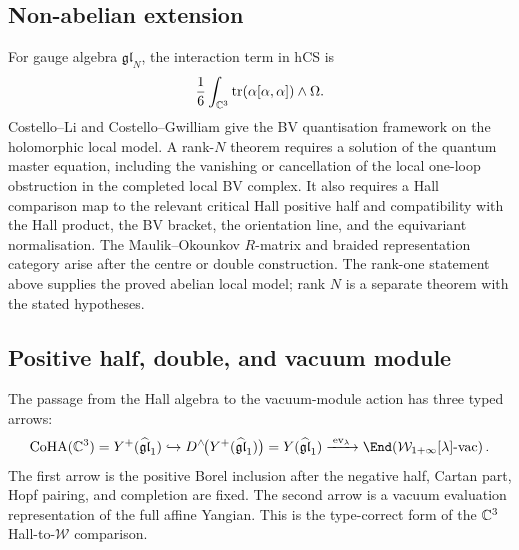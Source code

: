 \subsection*{Non-abelian extension}

For gauge algebra $\mathfrak{gl}_N$, the interaction term in hCS is
\[
  \frac{1}{6}\int_{\mathbb{C}^3}\mathrm{tr}(\alpha[\alpha,\alpha])\wedge\Omega .
\]
Costello--Li and Costello--Gwilliam give the BV quantisation framework
on the holomorphic local model. A rank-$N$ theorem requires a solution
of the quantum master equation, including the vanishing or cancellation
of the local one-loop obstruction in the completed local BV complex. It
also requires a Hall comparison map to the relevant critical Hall
positive half and compatibility with the Hall product, the BV bracket,
the orientation line, and the equivariant normalisation. The
Maulik--Okounkov $R$-matrix and braided representation category arise
after the centre or double construction. The rank-one statement above
supplies the proved abelian local model; rank $N$ is a separate theorem
with the stated hypotheses.

\subsection*{Positive half, double, and vacuum module}

The passage from the Hall algebra to the vacuum-module action has three
typed arrows:
\[
  \CoHA(\C^3)=\Ypos(\glhat_1)
  \hookrightarrow
  D^\wedge\!\bigl(\Ypos(\glhat_1)\bigr)
  =
  Y(\glhat_1)
  \xrightarrow{\;\mathrm{ev}_\lambda\;}
  \End\!\left(\mathcal{W}_{1+\infty}[\lambda]\text{-}\mathrm{vac}\right).
\]
The first arrow is the positive Borel inclusion after the negative half,
Cartan part, Hopf pairing, and completion are fixed. The second arrow is
a vacuum evaluation representation of the full affine Yangian. This is
the type-correct form of the $\mathbb{C}^3$ Hall-to-\(\mathcal W\) comparison.
